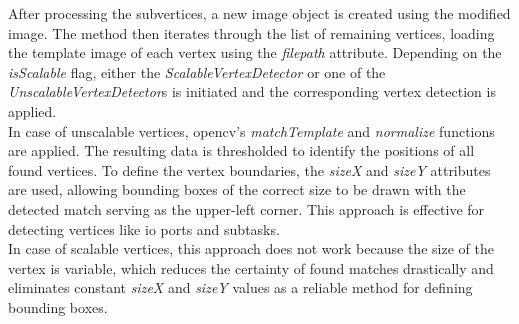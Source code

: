 After processing the subvertices, a new image object is created using the modified image. The method then iterates through the list of remaining vertices, loading the template image of each vertex using the \textit{filepath} attribute. Depending on the \textit{isScalable} flag, either the \textit{ScalableVertexDetector} or one of the \textit{UnscalableVertexDetector}s is initiated and the corresponding vertex detection is applied.\\
In case of unscalable vertices, \acrshort{opencv}'s \textit{matchTemplate} and \textit{normalize} functions are applied. The resulting data is thresholded to identify the positions of all found vertices. To define the vertex boundaries, the \textit{sizeX} and \textit{sizeY} attributes are used, allowing bounding boxes of the correct size to be drawn with the detected match serving as the upper-left corner. This approach is effective for detecting vertices like \acrshort{io} ports and subtasks.\\
In case of scalable vertices, this approach does not work because the size of the vertex is variable, which reduces the certainty of found matches drastically and eliminates constant \textit{sizeX} and \textit{sizeY} values as a reliable method for defining bounding boxes.

